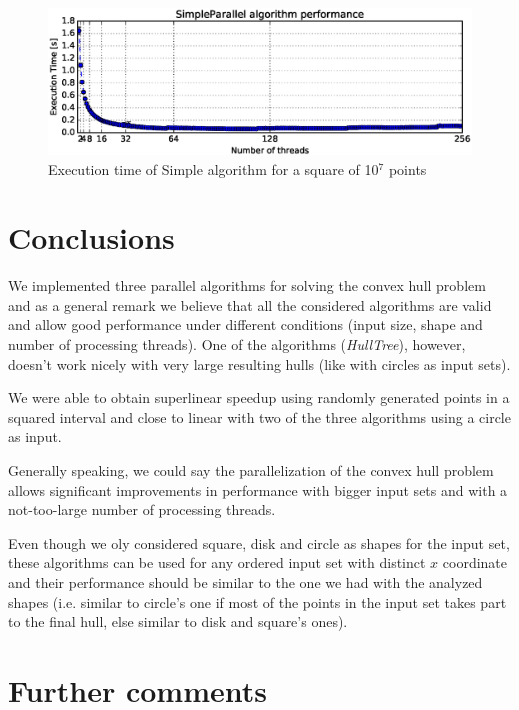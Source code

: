 \documentclass[letterpaper]{article}
\theoremstyle{definition}
\begin{document}
\begin{figure}[!ht]\centering
  \includegraphics[scale=0.33]{./plots/total.eps}
  \caption{Execution time of Simple algorithm for a square of 10$^7$ points\label{SimpleParallel Total}}
\end{figure}



\section{Conclusions}

We implemented three parallel algorithms for solving the convex hull problem and as a general remark we believe that all the considered algorithms are valid and allow good performance under different conditions (input size, shape and number of processing threads).
One of the algorithms (\textit{HullTree}), however, doesn't work nicely with very large resulting hulls (like with circles as input sets).

We were able to obtain superlinear speedup using randomly generated points in a squared interval %
and close to linear with two of the three algorithms using a circle as input.

Generally speaking, we could say the parallelization of the convex hull problem allows significant improvements in performance with bigger input sets and with a not-too-large number of processing threads.

Even though we oly considered square, disk and circle as shapes for the input set, these algorithms can be used for any ordered input set with distinct $x$ coordinate and their performance should be similar to the one we had with the analyzed shapes (i.e. similar to circle's one if most of the points in the input set takes part to the final hull, else similar to disk and square's ones).

\section{Further comments}
\iffalse
\end{document}
